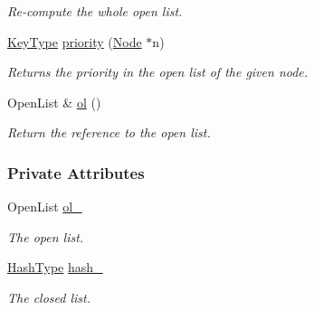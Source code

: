\begin{DoxyCompactItemize}
\begin{DoxyCompactList}\small\item\em Re-\/compute the whole open list. \end{DoxyCompactList}\item 
\hyperlink{structslb_1_1core_1_1sb_1_1OpenClosedList_a9ffd5756297080af110c9d55b588a34e}{Key\+Type} \hyperlink{structslb_1_1core_1_1sb_1_1OpenClosedList_aa56f6d93b10b1acd3ee9e3a25e73f581}{priority} (\hyperlink{structslb_1_1core_1_1sb_1_1OpenClosedList_ab4cf0f882c69f162e0eccf4abe5ad27e}{Node} $\ast$n)
\begin{DoxyCompactList}\small\item\em Returns the priority in the open list of the given node. \end{DoxyCompactList}\item 
Open\+List \& \hyperlink{structslb_1_1core_1_1sb_1_1OpenClosedList_a8be4837f70f9fbdbedc6b583cdd6d852}{ol} ()
\begin{DoxyCompactList}\small\item\em Return the reference to the open list. \end{DoxyCompactList}\end{DoxyCompactItemize}
\subsubsection*{Private Attributes}
\begin{DoxyCompactItemize}
\item 
Open\+List \hyperlink{structslb_1_1core_1_1sb_1_1OpenClosedList_af0b03321ca539d207335869c317a35d0}{ol\+\_\+}\hypertarget{structslb_1_1core_1_1sb_1_1OpenClosedList_af0b03321ca539d207335869c317a35d0}{}\label{structslb_1_1core_1_1sb_1_1OpenClosedList_af0b03321ca539d207335869c317a35d0}

\begin{DoxyCompactList}\small\item\em The open list. \end{DoxyCompactList}\item 
\hyperlink{structslb_1_1core_1_1sb_1_1OpenClosedList_a32a2b03f9f64969e70977f9b5f858b3f}{Hash\+Type} \hyperlink{structslb_1_1core_1_1sb_1_1OpenClosedList_aa33f9bad7bafcad43a38e15581842cf4}{hash\+\_\+}\hypertarget{structslb_1_1core_1_1sb_1_1OpenClosedList_aa33f9bad7bafcad43a38e15581842cf4}{}\label{structslb_1_1core_1_1sb_1_1OpenClosedList_aa33f9bad7bafcad43a38e15581842cf4}

\begin{DoxyCompactList}\small\item\em The closed list. \end{DoxyCompactList}\end{DoxyCompactItemize}


